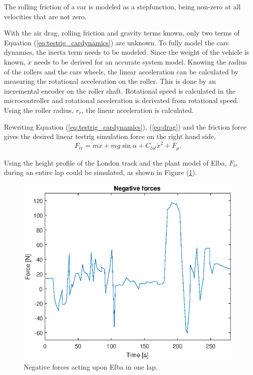 The rolling friction of a car is modeled as a stepfunction, being non-zero at
all velocities that are not zero.

With the air drag, rolling friction and gravity terms known, only two terms of
Equation (\ref{eq:testrig_cardynamics}) are unknown. To fully model the cars
dynamics, the inerta term needs to be modeled. Since the weight of the vehicle
is known, $\ddot{x}$ needs to be derived for an accurate system model.
Knowing the radius of the rollers and the cars wheels, the linear acceleration
can be calculated by measuring the rotational acceleration on the roller. This
is done by an incremental encoder on the roller shaft. Rotational speed is
calculated in the microcontroller and rotational acceleration is derivated from
rotational speed. Using the roller radius, $r_{r}$, the linear acceleration
is calculated.

Rewriting Equation (\ref{eq:testrig_cardynamics}), (\ref{eq:drag}) and the friction force gives the
desired linear testrig simulation force on the right hand side,
\begin{equation} \label{eq:simulationforce}
    F_{tr} = m\ddot{x} + mg\sin{\alpha} + C_{tot}\dot{x}^2 + F_{\mu}.
\end{equation}

Using the height profile of the London track and the plant model of Elba, $F_{tr}$ during an entire lap could be simulated, as shown in Figure (\ref{fig:testrig_negative_forces}).

\begin{figure}[H]
    \label{fig:testrig_negative_forces}
    \centering
    \includegraphics[width=\textwidth]{./img/testrig_negative_forces.eps}
    \caption{Negative forces acting upon Elba in one lap.}
\end{figure}

